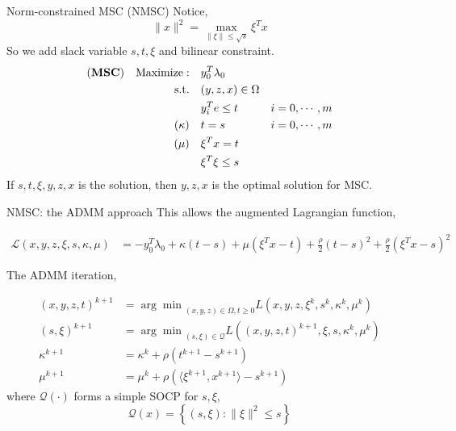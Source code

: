 \begin{frame}{Norm-constrained MSC (NMSC)}
  Notice,
  \begin{equation}
    \|x\|^2 = \max_{\|\xi\| \le \sqrt s} \xi^T x
  \end{equation}
  So we add slack variable \(s, t, \xi\) and bilinear constraint.
  \begin{align}
    (\textbf{MSC}) \quad \mathrm{Maximize: }\quad & y_0 ^T\lambda_0                     \\
    \mathrm{s.t.} \quad                        & (y,z,x) \in \Omega                  \\
                                               & y_i^Te \le t       & i=0, \cdots, m \\
    (\kappa) \quad                             & t= s               & i=0, \cdots, m \\
    (\mu)    \quad                             & \xi^Tx = t                          \\
                                               & \xi^T\xi \le s
  \end{align}
  If \(s, t, \xi, y, z, x\) is the solution, then \( y, z, x\) is the optimal solution for MSC.
\end{frame}
\begin{frame}{NMSC: the ADMM approach}
  This allows the augmented Lagrangian function,

  \begin{align*}
    \mathscr L\left(x,y,z,\xi,s,\kappa,\mu\right) & = - y_0 ^T\lambda_0 + \kappa(t-s) + \mu(\xi^Tx - t) + \frac{\rho}{2}(t-s)^2 + \frac{\rho}{2}(\xi^Tx - s)^2
  \end{align*}

  The ADMM iteration,

  \begin{align*}
    (x,y,z,t)^{k+1} & = {\arg\min}_{(x,y,z)\in\Omega, t\ge 0} L\left(x,y,z,\xi^k,s^k,\kappa^k,\mu^k\right)       \\
    (s, \xi)^{k+1}  & = {\arg\min}_{(s, \xi)\in\mathscr{Q}} L\left((x,y,z,t)^{k+1},\xi,s, \kappa^k, \mu^k\right) \\
    \kappa^{k+1}    & = \kappa^k + \rho\left(t^{k+1}-s^{k+1}\right)                                              \\
    \mu^{k+1}       & = \mu^k + \rho\left( \langle\xi^{k+1}, x^{k+1}\rangle - s^{k+1}\right)
  \end{align*}
  where \(\mathscr{Q(\cdot)}\) forms a simple SOCP for \(s, \xi\),
  \begin{equation}
    \mathscr{Q}(x) =\left\{(s,\xi): \|\xi\|^2 \le s\right\}
  \end{equation}
\end{frame}
